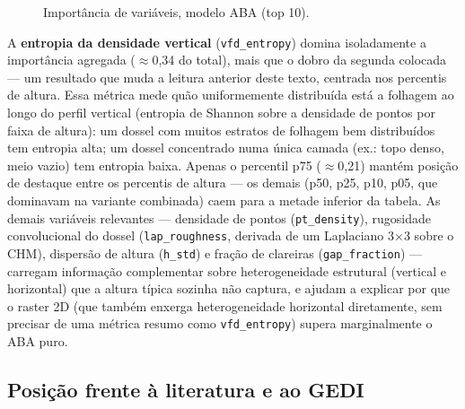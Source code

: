 \begin{figure}[H]
  \centering
  \caption{Importância de variáveis, modelo ABA (top 10).}
  \label{fig:importance}
\end{figure}

A \textbf{entropia da densidade vertical} (\texttt{vfd\_entropy}) domina
isoladamente a importância agregada ($\approx$0,34 do total), mais que o dobro da
segunda colocada --- um resultado que muda a leitura anterior deste texto,
centrada nos percentis de altura. Essa métrica mede quão uniformemente distribuída
está a folhagem ao longo do perfil vertical (entropia de Shannon sobre a densidade
de pontos por faixa de altura): um dossel com muitos estratos de folhagem bem
distribuídos tem entropia alta; um dossel concentrado numa única camada (ex.:
topo denso, meio vazio) tem entropia baixa. Apenas o percentil p75 ($\approx$0,21)
mantém posição de destaque entre os percentis de altura --- os demais (p50, p25,
p10, p05, que dominavam na variante combinada) caem para a metade inferior da
tabela. As demais variáveis relevantes --- densidade de pontos (\texttt{pt\_density}),
rugosidade convolucional do dossel (\texttt{lap\_roughness}, derivada de um
Laplaciano 3$\times$3 sobre o CHM), dispersão de altura (\texttt{h\_std}) e fração
de clareiras (\texttt{gap\_fraction}) --- carregam informação complementar sobre
heterogeneidade estrutural (vertical e horizontal) que a altura típica sozinha não
captura, e ajudam a explicar por que o raster 2D (que também enxerga
heterogeneidade horizontal diretamente, sem precisar de uma métrica resumo como
\texttt{vfd\_entropy}) supera marginalmente o ABA puro.

\subsection{Posição frente à literatura e ao GEDI}
\label{sec:gedi}

